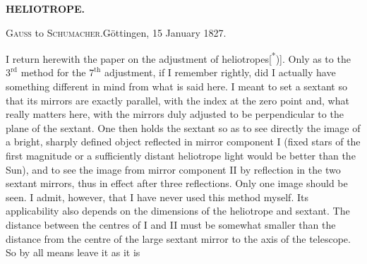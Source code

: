 \par\clearpage
\noindent\null\hfill{\small\textbf{HELIOTROPE.}}\hfill{}\par\bigskip
\begin{center}{\large\textsc{Gauss} to \textsc{Schumacher}.\quad Göttingen, 15 January 1827.}\end{center}
\par\noindent\hspace*{\parindent}I return herewith the paper on the adjustment of heliotropes[\textsuperscript{*})]. Only as to the $3^{\mathrm{rd}}$ method for the $7^{\mathrm{th}}$ adjustment, if I remember rightly, did I actually have something different in mind from what is said here. I meant to set a sextant so that its mirrors are exactly parallel, with the index at the  zero point and, what really matters here, with the mirrors duly adjusted to be perpendicular to the plane of the sextant. One then holds the sextant so as to see directly the image of a bright, sharply defined object reflected in mirror component I (fixed stars of the first magnitude or a sufficiently distant heliotrope light would be better than the Sun), and to see the image from mirror component II by reflection in the two sextant mirrors, thus in effect after three reflections. Only one image should be seen. I admit, however, that I have never used this method myself. Its applicability also depends on the dimensions of the heliotrope and sextant. The distance between the centres of I and II must be somewhat smaller than the distance from the centre of the large sextant mirror to the axis of the telescope. So by all means leave it as it is
